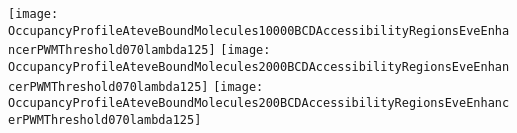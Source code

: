 \documentclass[11pt]{article}
\begin{document}
 

\clearpage

\begin{center}
\texttt{[image: OccupancyProfileAteveBoundMolecules10000BCDAccessibilityRegionsEveEnhancerPWMThreshold070lambda125]}
\texttt{[image: OccupancyProfileAteveBoundMolecules2000BCDAccessibilityRegionsEveEnhancerPWMThreshold070lambda125]}
\texttt{[image: OccupancyProfileAteveBoundMolecules200BCDAccessibilityRegionsEveEnhancerPWMThreshold070lambda125]}
\end{center}
\end{document}
